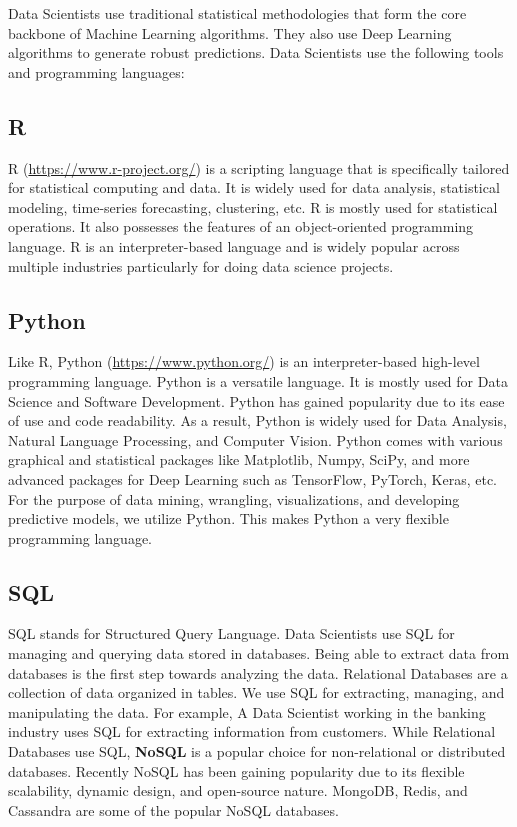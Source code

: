 \documentclass[
]{book}
\begin{document}
Data Scientists use traditional statistical methodologies that form the core backbone of Machine Learning algorithms. They also use Deep Learning algorithms to generate robust predictions. Data Scientists use the following tools and programming languages:

\hypertarget{r}{%
\subsection*{R}\label{r}}


R (\url{https://www.r-project.org/}) is a scripting language that is specifically tailored for statistical computing and data. It is widely used for data analysis, statistical modeling, time-series forecasting, clustering, etc. R is mostly used for statistical operations. It also possesses the features of an object-oriented programming language. R is an interpreter-based language and is widely popular across multiple industries particularly for doing data science projects.

\hypertarget{python}{%
\subsection*{Python}\label{python}}


Like R, Python (\url{https://www.python.org/}) is an interpreter-based high-level programming language. Python is a versatile language. It is mostly used for Data Science and Software Development. Python has gained popularity due to its ease of use and code readability. As a result, Python is widely used for Data Analysis, Natural Language Processing, and Computer Vision. Python comes with various graphical and statistical packages like Matplotlib, Numpy, SciPy, and more advanced packages for Deep Learning such as TensorFlow, PyTorch, Keras, etc. For the purpose of data mining, wrangling, visualizations, and developing predictive models, we utilize Python. This makes Python a very flexible programming language.

\hypertarget{sql}{%
\subsection*{SQL}\label{sql}}


SQL stands for Structured Query Language. Data Scientists use SQL for managing and querying data stored in databases. Being able to extract data from databases is the first step towards analyzing the data. Relational Databases are a collection of data organized in tables. We use SQL for extracting, managing, and manipulating the data. For example, A Data Scientist working in the banking industry uses SQL for extracting information from customers. While Relational Databases use SQL, \textbf{NoSQL} is a popular choice for non-relational or distributed databases. Recently NoSQL has been gaining popularity due to its flexible scalability, dynamic design, and open-source nature. MongoDB, Redis, and Cassandra are some of the popular NoSQL databases.
\end{document}
